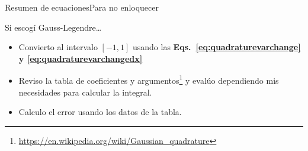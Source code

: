 \documentclass[spanish, c, dvipsnames]{beamer}
\begin{document}
\begin{frame}[t, allowframebreaks]{Resumen de ecuaciones}{Para no enloquecer}
\begin{exampleblock}{Si escogí Gauss-Legendre\dots}
    \begin{itemize}
        \itemsep1ex
        \item Convierto al intervalo $[-1, 1]$ usando las \textbf{Eqs.~\ref{eq:quadraturevarchange} y \ref{eq:quadraturevarchangedx}}
        \item Reviso la \alert{tabla de coeficientes y argumentos}\footnote{\url{https://en.wikipedia.org/wiki/Gaussian\_quadrature}} y evalúo dependiendo mis necesidades para calcular la integral.
        \item Calculo el error usando los datos de la tabla.
    \end{itemize}
\end{exampleblock}
\end{frame}





\end{document}
